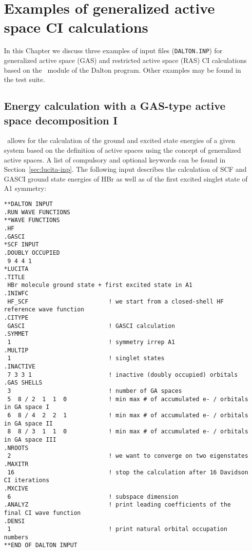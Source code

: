 \chapter{Examples of generalized active space CI calculations}
\label{ch:lucitaexamples}

In this Chapter we discuss three examples of input files (\verb|DALTON.INP|) 
for generalized active space (GAS) and restricted active space (RAS) 
CI calculations based on the \lucita\ module of the Dalton program. 
Other examples may be found in the test suite. 

\section{Energy calculation with a GAS-type active space decomposition I}\label{cc:lucitaex:gas1}
%
\lucita\  allows for the calculation of the ground and excited state energies
of a given system based on the definition of active spaces using the concept of generalized active spaces. 
A list of compulsory and optional keywords can be found in Section~\ref{sec:lucita-inp}. 
The following input describes the calculation of SCF and GASCI ground state energies of HBr as well as of the 
first excited singlet state of A1 symmetry:

%
\begin{verbatim}
**DALTON INPUT
.RUN WAVE FUNCTIONS
**WAVE FUNCTIONS
.HF
.GASCI
*SCF INPUT
.DOUBLY OCCUPIED
 9 4 4 1
*LUCITA
.TITLE
 HBr molecule ground state + first excited state in A1
.INIWFC
 HF_SCF                       ! we start from a closed-shell HF reference wave function
.CITYPE
 GASCI                        ! GASCI calculation
.SYMMET
 1                            ! symmetry irrep A1
.MULTIP
 1                            ! singlet states
.INACTIVE
 7 3 3 1                      ! inactive (doubly occupied) orbitals
.GAS SHELLS
 3                            ! number of GA spaces
 5  8 / 2  1  1  0            ! min max # of accumulated e- / orbitals in GA space I
 6  8 / 4  2  2  1            ! min max # of accumulated e- / orbitals in GA space II
 8  8 / 3  1  1  0            ! min max # of accumulated e- / orbitals in GA space III
.NROOTS
 2                            ! we want to converge on two eigenstates
.MAXITR
 16                           ! stop the calculation after 16 Davidson CI iterations
.MXCIVE
 6                            ! subspace dimension
.ANALYZ                       ! print leading coefficients of the final CI wave function
.DENSI
 1                            ! print natural orbital occupation numbers
**END OF DALTON INPUT
\end{verbatim}


